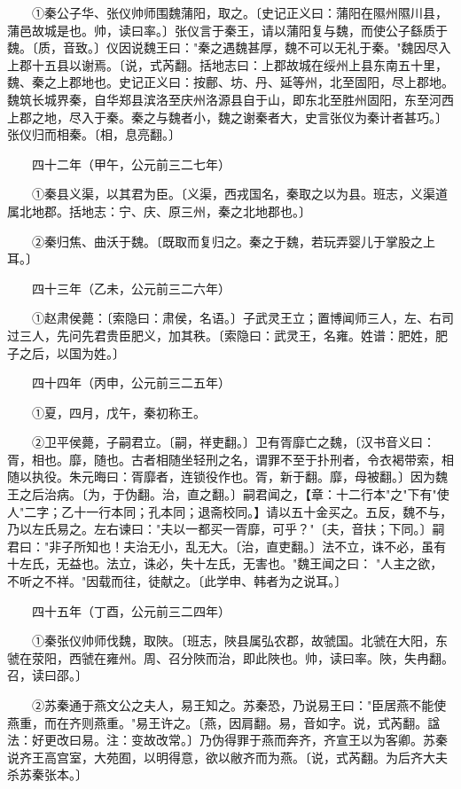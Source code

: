 　　①秦公子华、张仪帅师围魏蒲阳，取之。〔史记正义曰：蒲阳在隰州隰川县，蒲邑故城是也。帅，读曰率。〕张仪言于秦王，请以蒲阳复与魏，而使公子繇质于魏。〔质，音致。〕仪因说魏王曰："秦之遇魏甚厚，魏不可以无礼于秦。"魏因尽入上郡十五县以谢焉。〔说，式芮翻。括地志曰：上郡故城在绥州上县东南五十里，魏、秦之上郡地也。史记正义曰：按鄜、坊、丹、延等州，北至固阳，尽上郡地。魏筑长城界秦，自华郑县滨洛至庆州洛源县自于山，即东北至胜州固阳，东至河西上郡之地，尽入于秦。秦之与魏者小，魏之谢秦者大，史言张仪为秦计者甚巧。〕张仪归而相秦。〔相，息亮翻。〕

　　四十二年（甲午，公元前三二七年）

　　①秦县义渠，以其君为臣。〔义渠，西戎国名，秦取之以为县。班志，义渠道属北地郡。括地志：宁、庆、原三州，秦之北地郡也。〕

　　②秦归焦、曲沃于魏。〔既取而复归之。秦之于魏，若玩弄婴儿于掌股之上耳。〕

　　四十三年（乙未，公元前三二六年）

　　①赵肃侯薨：〔索隐曰：肃侯，名语。〕子武灵王立；置博闻师三人，左、右司过三人，先问先君贵臣肥义，加其秩。〔索隐曰：武灵王，名雍。姓谱：肥姓，肥子之后，以国为姓。〕

　　四十四年（丙申，公元前三二五年）

　　①夏，四月，戊午，秦初称王。

　　②卫平侯薨，子嗣君立。〔嗣，祥吏翻。〕卫有胥靡亡之魏，〔汉书音义曰：胥，相也。靡，随也。古者相随坐轻刑之名，谓罪不至于扑刑者，令衣褐带索，相随以执役。朱元晦曰：胥靡者，连锁役作也。胥，新于翻。靡，母被翻。〕因为魏王之后治病。〔为，于伪翻。治，直之翻。〕嗣君闻之，【章：十二行本"之"下有"使人"二字；乙十一行本同；孔本同；退斋校同。】请以五十金买之。五反，魏不与，乃以左氏易之。左右谏曰："夫以一都买一胥靡，可乎？"〔夫，音扶；下同。〕嗣君曰："非子所知也！夫治无小，乱无大。〔治，直吏翻。〕法不立，诛不必，虽有十左氏，无益也。法立，诛必，失十左氏，无害也。"魏王闻之曰： "人主之欲，不听之不祥。"因载而往，徒献之。〔此学申、韩者为之说耳。〕

　　四十五年（丁酉，公元前三二四年）

　　①秦张仪帅师伐魏，取陜。〔班志，陜县属弘农郡，故虢国。北虢在大阳，东虢在荥阳，西虢在雍州。周、召分陜而治，即此陜也。帅，读曰率。陜，失冉翻。召，读曰邵。〕

　　②苏秦通于燕文公之夫人，易王知之。苏秦恐，乃说易王曰："臣居燕不能使燕重，而在齐则燕重。"易王许之。〔燕，因肩翻。易，音如字。说，式芮翻。諡法：好更改曰易。注：变故改常。〕乃伪得罪于燕而奔齐，齐宣王以为客卿。苏秦说齐王高宫室，大苑囿，以明得意，欲以敝齐而为燕。〔说，式芮翻。为后齐大夫杀苏秦张本。〕

